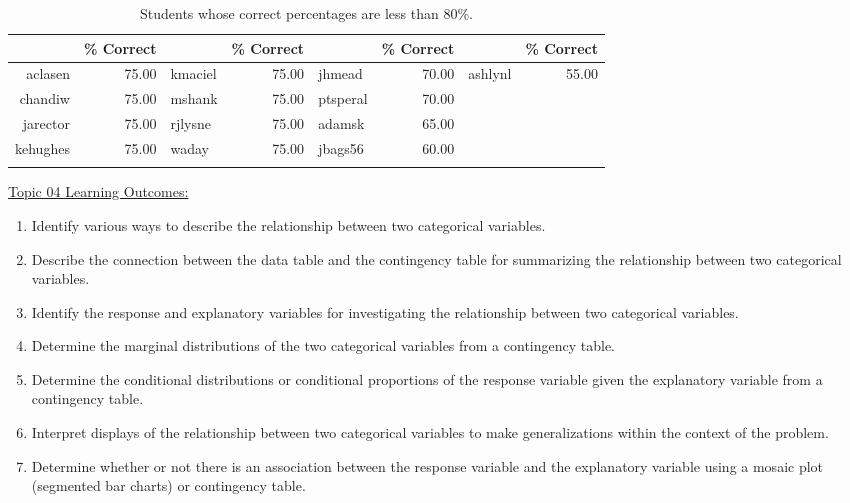 \documentclass[12pt,english,nohyper]{tufte-handout}\usepackage[]{graphicx}\usepackage[]{color}
\begin{document}
\begin{fullwidth}
\makeatletter\setlength\hsize{\@tufte@fullwidth}\makeatother
\begin{longtable}{rr|lr|lr|lr}
  \hline
  & \% Correct &   & \% Correct &   & \% Correct &   & \% Correct \\ 
  \hline
aclasen & 75.00 & kmaciel & 75.00 & jhmead & 70.00 & ashlynl & 55.00 \\ 
  chandiw & 75.00 & mshank & 75.00 & ptsperal & 70.00 &  &  \\ 
  jarector & 75.00 & rjlysne & 75.00 & adamsk & 65.00 &  &  \\ 
  kehughes & 75.00 & waday & 75.00 & jbags56 & 60.00 &  &  \\ 
   \hline
\hline
\caption{Students whose correct percentages are less than 80\%.} 
\label{tab:studentsbelow80}
\end{longtable}

\end{fullwidth}



\vspace{-2mm}

\noindent
\underline{Topic 04 Learning Outcomes:}
\vspace{2mm}

\begin{fullwidth}
\begin{enumerate}[label=\Alph*.,itemsep=-\parsep,leftmargin=*]
  \item
Identify various ways to describe the relationship between two categorical variables.
\item Describe the connection between the data table and the contingency table for summarizing the relationship between two categorical variables.
\item Identify the response and explanatory variables for investigating the relationship between two categorical variables.
\item Determine the marginal distributions of the two categorical variables from a contingency table.
\item Determine the conditional distributions or conditional proportions of the response variable given the explanatory variable from a contingency table.
\item Interpret displays of the relationship between two categorical variables to make generalizations within the context of the problem.
\item Determine whether or not there is an association between the response variable and the explanatory variable using a mosaic plot (segmented bar charts) or contingency table.

\end{enumerate}
\end{fullwidth}
\end{document}

